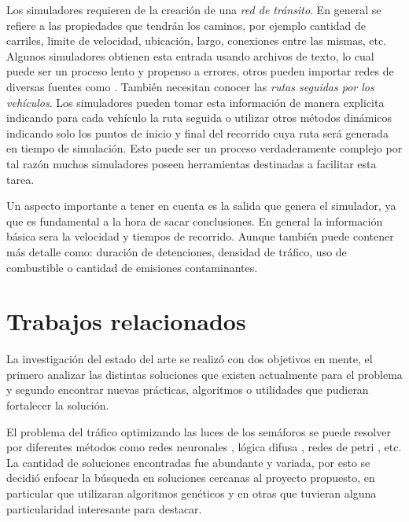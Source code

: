 Los simuladores requieren de la creación de una \emph{red de tránsito}. En general se refiere a las propiedades que tendrán los caminos, por ejemplo cantidad de carriles, limite de velocidad, ubicación, largo, conexiones entre las mismas, etc. Algunos simuladores obtienen esta entrada usando archivos de texto, lo cual puede ser un proceso lento y propenso a errores, otros pueden importar redes de diversas fuentes como \citet{OSM}. También necesitan conocer las\emph{ rutas seguidas por los vehículos}. Los simuladores pueden tomar esta información de manera explicita indicando para cada vehículo la ruta seguida o utilizar otros métodos dinámicos indicando solo los puntos de inicio y final del recorrido cuya ruta será generada en tiempo de simulación. Esto puede ser un proceso verdaderamente complejo por tal razón muchos simuladores poseen herramientas destinadas a facilitar esta tarea.

Un aspecto importante a tener en cuenta es la salida que genera el simulador, ya que es fundamental a la hora de sacar conclusiones. En general la información básica sera la velocidad y tiempos de recorrido. Aunque también puede contener más detalle como: duración de detenciones, densidad de tráfico, uso de combustible o cantidad de emisiones contaminantes.  
 
\section{Trabajos relacionados}

La investigación del estado del arte se realizó con dos objetivos en mente, el primero analizar las distintas soluciones que existen actualmente para el problema y segundo encontrar nuevas prácticas, algoritmos o utilidades que pudieran fortalecer la solución.

El problema del tráfico optimizando las luces de los semáforos se puede resolver por diferentes métodos como  redes neuronales \citep{Lopez1999}, lógica difusa \citep{Lim2001}, redes de petri \citep{DiFebbraro2002}, etc. La cantidad de soluciones encontradas fue abundante y variada, por esto se decidió enfocar la búsqueda en soluciones cercanas al proyecto propuesto, en particular que utilizaran algoritmos genéticos y en otras que tuvieran alguna particularidad interesante para destacar.


